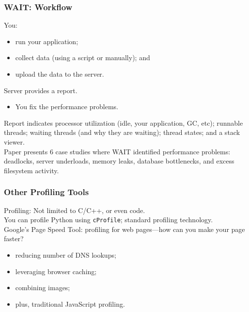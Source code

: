 \begin{frame}
  \frametitle{WAIT: Workflow}

\large
\begin{changemargin}{1.5cm}

You:
\begin{itemize}
\item run your application;
\item collect data (using a script or manually); and 
\item upload the data to the server.
\end{itemize}
Server provides
a report.\\
\begin{itemize}
\item You fix the performance problems.\\[1em]
\end{itemize}

Report indicates processor utilization (idle, your application, GC, 
etc); runnable threads; waiting threads (and why they are waiting); 
thread states; and a stack viewer.\\[1em]

Paper presents 6 case studies where WAIT identified performance
problems: deadlocks, server underloads, memory leaks, database
bottlenecks, and excess filesystem activity.

\end{changemargin}
\end{frame}


\begin{frame}[fragile]
  \frametitle{Other Profiling Tools}

  
\large
\begin{changemargin}{1.5cm}
    Profiling: Not limited to C/C++, or even code.\\[1em]

    You can profile Python using {\tt cProfile}; standard profiling technology.\\[1em]

    Google's Page Speed Tool: profiling for web pages---how can you make your page faster?\\
\begin{itemize}
\item reducing number of DNS lookups;
\item leveraging browser caching;
\item combining images;
\item plus, traditional JavaScript profiling.
\end{itemize}
\end{changemargin}
\end{frame}

